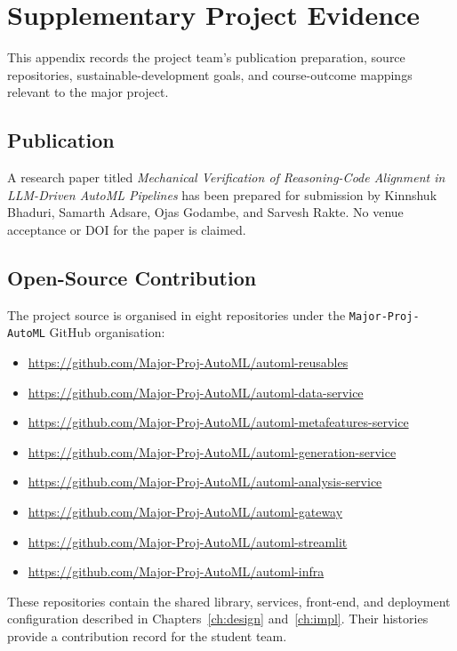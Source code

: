 \chapter{Supplementary Project Evidence}

This appendix records the project team's publication preparation,
source repositories, sustainable-development goals, and course-outcome
mappings relevant to the major project.

\section{Publication}
\label{sec:appendix-publication}

A research paper titled \emph{Mechanical Verification of
Reasoning-Code Alignment in LLM-Driven AutoML Pipelines} has been
prepared for submission by Kinnshuk Bhaduri, Samarth Adsare, Ojas
Godambe, and Sarvesh Rakte. No venue acceptance or DOI for the paper
is claimed.

\section{Open-Source Contribution}
\label{sec:appendix-opensource}

The project source is organised in eight repositories under the
\texttt{Major-Proj-AutoML} GitHub organisation:

\begin{itemize}[itemsep=0pt, topsep=0.5em, parsep=0pt]
\small
    \item \url{https://github.com/Major-Proj-AutoML/automl-reusables}
    \item \url{https://github.com/Major-Proj-AutoML/automl-data-service}
    \item \url{https://github.com/Major-Proj-AutoML/automl-metafeatures-service}
    \item \url{https://github.com/Major-Proj-AutoML/automl-generation-service}
    \item \url{https://github.com/Major-Proj-AutoML/automl-analysis-service}
    \item \url{https://github.com/Major-Proj-AutoML/automl-gateway}
    \item \url{https://github.com/Major-Proj-AutoML/automl-streamlit}
    \item \url{https://github.com/Major-Proj-AutoML/automl-infra}
\end{itemize}

These repositories contain the shared library, services, front-end,
and deployment configuration described in Chapters~\ref{ch:design}
and~\ref{ch:impl}. Their histories provide a contribution record for
the student team.

